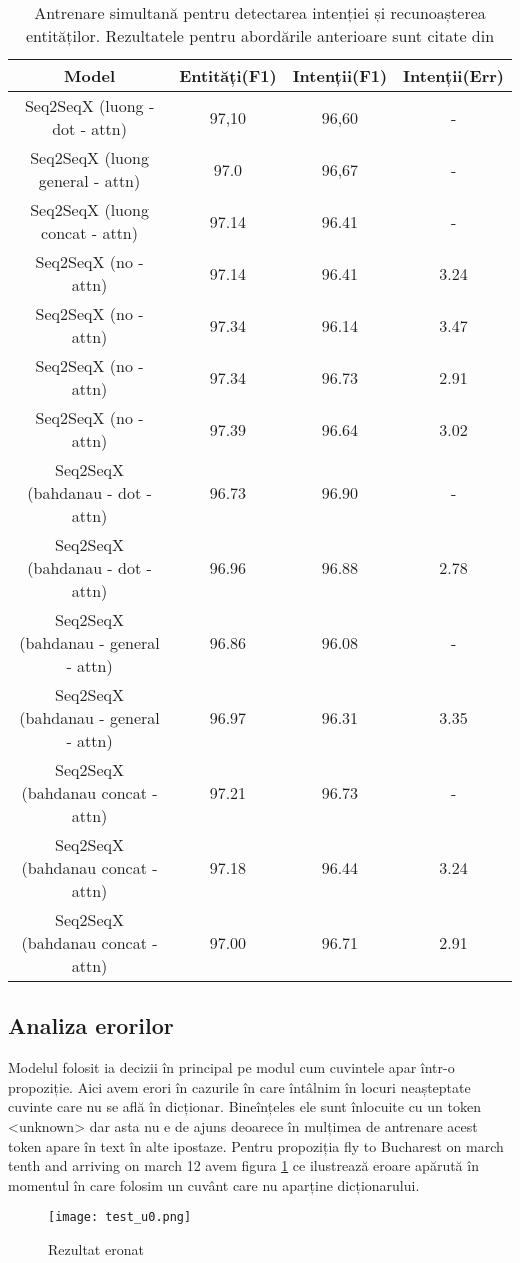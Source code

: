\bigskip
\begin{table}[htp]
	\small
	\centering
	\begin{tabular}{ c c c c} 
		\hline
		\textbf{Model} 		 & \textbf{Entități(F1)} & \textbf{Intenții(F1)} & \textbf{Intenții(Err)} \\
		\hline
		Seq2SeqX (luong - dot - attn) & 97,10 & 96,60 & - \\ %
		Seq2SeqX (luong general - attn) & 97.0 & 96,67 & - \\ %
		Seq2SeqX (luong concat - attn) & 97.14 & 96.41 & - \\ %
		\hline
		Seq2SeqX (no - attn) & 97.14 & 96.41 & 3.24 \\ %
		Seq2SeqX (no - attn) & 97.34 & 96.14 & 3.47 \\ %
		Seq2SeqX (no - attn) & 97.34 & 96.73 & 2.91 \\ %
		Seq2SeqX (no - attn) & 97.39 & 96.64 & 3.02 \\ %
		\hline
		Seq2SeqX (bahdanau - dot - attn) & 96.73 & 96.90 & - \\ %
		Seq2SeqX (bahdanau - dot - attn) & 96.96 & 96.88 & 2.78 \\ %
		\hline
		Seq2SeqX (bahdanau - general - attn) & 96.86 & 96.08 & - \\ %
		Seq2SeqX (bahdanau - general - attn) & 96.97 & 96.31 & 3.35 \\ %
		\hline
		Seq2SeqX (bahdanau concat - attn) & 97.21 & 96.73 & - \\ %
		Seq2SeqX (bahdanau concat - attn) & 97.18 & 96.44 & 3.24 \\ %
		Seq2SeqX (bahdanau concat - attn) & 97.00 & 96.71 & 2.91 \\ %
		\hline
	\end{tabular}
	\caption{Antrenare simultană pentru detectarea intenției și recunoașterea entităților. Rezultatele pentru abordările anterioare sunt citate din \cite{att_joint_bing}}
	\label{rezultate2}
\end{table}

\subsection{Analiza erorilor}

Modelul folosit ia decizii în principal pe modul cum cuvintele apar într-o propoziție. Aici avem erori în cazurile în care întâlnim în locuri neașteptate cuvinte care nu se află în dicționar. Bineînțeles ele sunt înlocuite cu un token  <unknown> dar asta nu e de ajuns deoarece în mulțimea de antrenare acest token apare în text în alte ipostaze.
Pentru propoziția {\ttfamily fly to Bucharest on march tenth and arriving on march 12} avem figura \ref{fig:test_u0} ce ilustrează eroare apărută în momentul în care folosim un cuvânt care nu aparține dicționarului.
\begin{figure}[h]
	\centering
	\texttt{[image: test\_u0.png]}
	\caption{Rezultat eronat}
	\label{fig:test_u0}
\end{figure}

